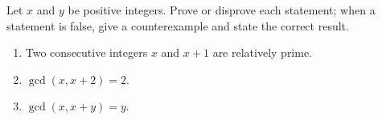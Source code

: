 Let $x$ and $y$ be positive integers. Prove or disprove each statement; when a statement is false, give a counterexample and state the correct result.
\begin{enumerate}
\item[(a)] Two consecutive integers $x$ and $x+1$ are relatively prime.
\item[(b)] $\gcd(x,x+2)=2$.
\item[(c)] $\gcd(x,x+y)=y$.
\end{enumerate}
